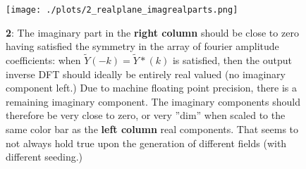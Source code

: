 \begin{figure}[h!]
  \centering
  \texttt{[image: ./plots/2\_realplane\_imagrealparts.png]}
  \caption{\textbf{2}: The imaginary part in the \textbf{right column} should be close to zero having satisfied the symmetry in the array of fourier amplitude coefficients: when $\widetilde{Y}(-k)=\widetilde{Y}*(k)$ is satisfied, then the output inverse DFT should ideally be entirely real valued (no imaginary component left.) Due to machine floating point precision, there is a remaining imaginary component. The imaginary components should therefore be very close to zero, or very ''dim'' when scaled to the same color bar as the \textbf{left column} real components. That seems to not always hold true upon the generation of different fields (with different seeding.)}
  \label{fig:imagrealparts}
\end{figure}


